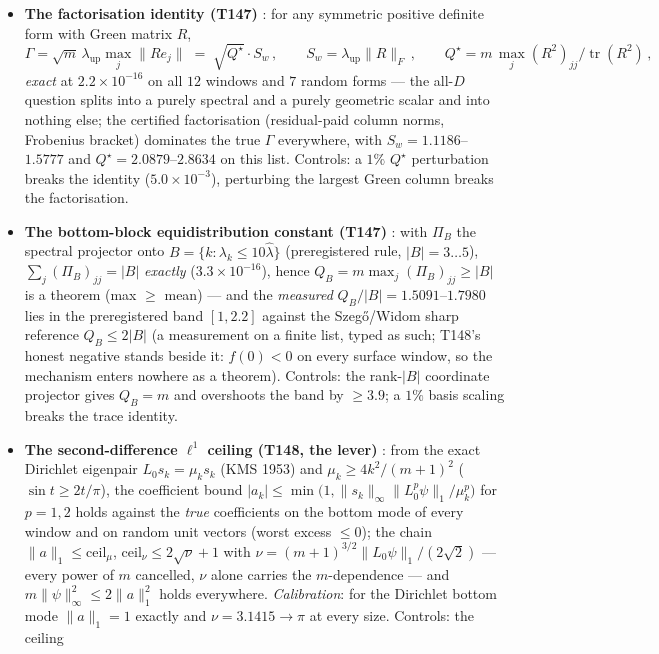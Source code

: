 \documentclass[11pt,a4paper]{article}
\begin{document}
\begin{itemize}[leftmargin=1.5em]
\item \textbf{The factorisation identity (T147)} \mE: for any symmetric positive definite form
with Green matrix $R$,
\[
\Gamma=\sqrt m\,\lambda_{\mathrm{up}}\max_j\|Re_j\|
\;=\;\sqrt{Q^\star}\cdot S_w\,,\qquad
S_w=\lambda_{\mathrm{up}}\|R\|_F\,,\qquad
Q^\star=m\,\max_j(R^2)_{jj}/\operatorname{tr}(R^2)\,,
\]
\emph{exact} at $2.2\times10^{-16}$ on all $12$ windows and $7$ random forms --- the all-$D$
question splits into a purely spectral and a purely geometric scalar and into nothing else; the
certified factorisation (residual-paid column norms, Frobenius bracket) dominates the true
$\Gamma$ everywhere, with $S_w=1.1186$--$1.5777$ and $Q^\star=2.0879$--$2.8634$ on this list.
Controls: a $1\%$ $Q^\star$ perturbation breaks the identity ($5.0\times10^{-3}$), perturbing
the largest Green column breaks the factorisation.
\item \textbf{The bottom-block equidistribution constant (T147)} \mE: with $\Pi_B$ the spectral
projector onto $B=\{k:\lambda_k\le10\hat\lambda\}$ (preregistered rule, $|B|=3\ldots5$),
$\sum_j(\Pi_B)_{jj}=|B|$ \emph{exactly} ($3.3\times10^{-16}$), hence
$Q_B=m\max_j(\Pi_B)_{jj}\ge|B|$ is a theorem (max $\ge$ mean) --- and the \emph{measured}
$Q_B/|B|=1.5091$--$1.7980$ lies in the preregistered band $[1,2.2]$ against the
Szeg\H{o}/Widom sharp reference $Q_B\le2|B|$ (a measurement on a finite list, typed as such;
T148's honest negative stands beside it: $f(0)<0$ on every surface window, so the mechanism
enters nowhere as a theorem). Controls: the rank-$|B|$ coordinate projector gives $Q_B=m$ and
overshoots the band by $\ge3.9$; a $1\%$ basis scaling breaks the trace identity.
\item \textbf{The second-difference $\ell^1$ ceiling (T148, the lever)} \mE: from the exact
Dirichlet eigenpair $L_0s_k=\mu_ks_k$ (KMS 1953) and $\mu_k\ge4k^2/(m+1)^2$
($\sin t\ge2t/\pi$), the coefficient bound
$|a_k|\le\min\bigl(1,\|s_k\|_\infty\|L_0^p\psi\|_1/\mu_k^p\bigr)$ for $p=1,2$ holds against the
\emph{true} coefficients on the bottom mode of every window and on random unit vectors (worst
excess $\le0$); the chain $\|a\|_1\le\mathrm{ceil}_\mu$,
$\mathrm{ceil}_\nu\le2\sqrt\nu+1$ with $\nu=(m+1)^{3/2}\|L_0\psi\|_1/(2\sqrt2)$ --- every power
of $m$ cancelled, $\nu$ alone carries the $m$-dependence --- and
$m\|\psi\|_\infty^2\le2\|a\|_1^2$ holds everywhere. \emph{Calibration}: for the Dirichlet
bottom mode $\|a\|_1=1$ exactly and $\nu=3.1415\to\pi$ at every size. Controls: the ceiling

\end{itemize}
\end{document}
